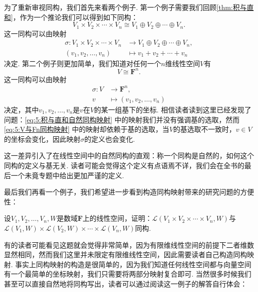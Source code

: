 为了重新审视同构，我们首先来看两个例子. 第一个例子需要我们回顾\autoref{thm:积与直和}，作为一个推论我们可以得到如下同构：
\begin{equation} \label{eq:5:积与直和自然同构}
    V_1\times V_2\times\cdots\times V_n\cong V_1\oplus V_2\oplus\cdots\oplus V_n.
\end{equation}
这一同构可以由映射
\begin{equation} \label{eq:5:积与直和自然同构映射}
    \begin{aligned}
        \sigma:V_1\times V_2\times\cdots\times V_n & \to V_1\oplus V_2\oplus\cdots\oplus V_n, \\
        (v_1,v_2,\ldots,v_n)                       & \mapsto v_1+v_2+\cdots+v_n
    \end{aligned}
\end{equation}
决定. 第二个例子则更加简单，我们知道对任何一个$n$维线性空间$V$有
\begin{equation} \label{eq:5:V与Fn同构}
    V\cong\mathbf{F}^n.
\end{equation}
这一同构可以由映射
\begin{equation} \label{eq:5:V与Fn同构映射}
    \begin{aligned}
        \sigma:V & \to\mathbf{F}^n,            \\
        v        & \mapsto(v_1,v_2,\ldots,v_n)
    \end{aligned}
\end{equation}
决定，其中$v_1,v_2,\ldots,v_n$是$v$在$V$的某一组基下的坐标. 相信读者读到这里已经发现了问题：\autoref{eq:5:积与直和自然同构映射} 中的映射我们并没有强调基的选取，然而\autoref{eq:5:V与Fn同构映射} 中的映射却依赖于基的选取，当$V$的基选取不一致时，$v\in V$的坐标会变化，因此映射$\sigma$的定义也会变化.

这一差异引入了在线性空间中的自然同构的直观：称一个同构是自然的，如何这个同构的定义与基无关. 读者可能会觉得这个定义有点语焉不详，我们会在全书的最后一个未竟专题中给出更加严谨的定义.

最后我们再看一个例子，我们希望进一步看到构造同构映射带来的研究问题的方便性：
\begin{example}{}{}
    设$V_1,V_2,\ldots,V_n,W$是数域$\mathbf{F}$上的线性空间，证明：$\mathcal{L}(V_1 \times V_2 \times \cdots \times V_n,W)$与$\mathcal{L}(V_1,W) \times \mathcal{L}(V_2,W) \times \cdots \times \mathcal{L}(V_n,W)$同构.
\end{example}
有的读者可能看见这题就会觉得非常简单，因为有限维线性空间的前提下二者维数显然相同，然而我们这里并未限定有限维线性空间，因此需要读者自己构造同构映射. 事实上同构映射的构造是很简单的，因为我们知道任何线性空间都与向量空间有一个最简单的坐标映射，我们只需要将两部分映射复合即可. 当然很多时候我们甚至可以直接自然地将同构写出，读者可以通过阅读这一例子的解答自行体会：


